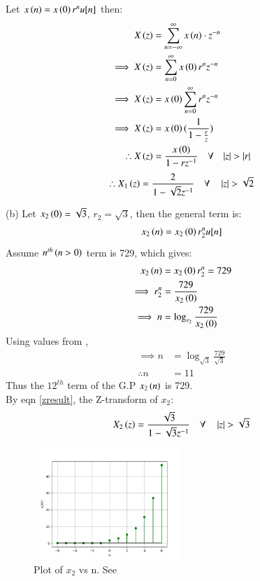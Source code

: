 \documentclass[journal,12pt,twocolumn]{IEEEtran}
\theoremstyle{remark}
\begin{document}
Let $x\left(n\right) = x\left(0\right)r^nu[n]$ then:
\begin{align}
    X\left(z\right) &= \sum_{n = -\infty}^{\infty}{x\left(n\right) \cdot z^{-n}}\\
    \implies X\left(z\right) &= \sum_{n = 0}^{\infty}{x\left(0\right)r^{n}z^{-n}}\\
    \implies X\left(z\right) &= x\left(0\right)\sum_{n = 0}^{\infty}{r^n z^{-n}}\\
    \implies X\left(z\right) &= x\left(0\right)(\frac{1}{1 - \frac{r}{z}})\\
	\therefore X\left(z\right) &= \frac{x\left(0\right)}{1 - rz^{-1}} \quad \forall \quad {\left\vert z\right\vert > \left\vert r\right\vert} \label{zresult}
\end{align}
\begin{align}
    \therefore X_1\left(z\right) = \frac{2}{1 - \sqrt{2}z^{-1}} \quad \forall \quad \left\vert z\right\vert > \sqrt{2}
\end{align}

(b) Let $x_2\left(0\right) = \sqrt{3}$, $r_2 = \sqrt{3}$, then the general term is:
\begin{align}
    x_2\left(n\right) = x_2\left(0\right) r_2^nu[n]
\end{align}
Assume $n^{th}\left(n > 0\right)$ term is 729, which gives: 
\begin{align}
    x_2\left(n\right) &= x_2\left(0\right) r_2^n = 729\\
    \implies r_2^n &= \frac{729}{x_2\left(0\right)}\\
    \implies n &= \log_{r_2}{\frac{729}{x_2\left(0\right)}}
\end{align}
Using values from ,
\begin{align}
    \implies n &= \log_{\sqrt{3}}{\frac{729}{\sqrt{3}}}\\
    \therefore n &= 11
\end{align}
Thus the $12^{th}$ term of the G.P $x_2\left(n\right)$ is 729. \\

By eqn \ref{zresult}, the Z-transform of $x_2$:
\begin{align}
    X_2\left(z\right) = \frac{\sqrt{3}}{1 - \sqrt{3}z^{-1}} \quad \forall \quad \left\vert z\right\vert > \sqrt{3} 
\end{align}

\begin{figure}[h!]
    \renewcommand\thefigure{2}
    \centering
    \includegraphics[width=0.5\textwidth]{figs/b.png}
    \caption[short]{Plot of $x_2$ vs n. See }
    \label{fig:img2}
\end{figure}
\end{document}
